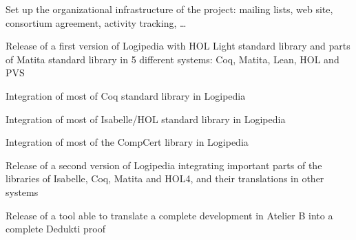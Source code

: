 

\begin{milestones}
    {Set up the organizational infrastructure of the project: mailing lists, web site, consortium agreement, activity tracking, \ldots}

     {Release of a first version of Logipedia with HOL Light standard library and parts of Matita standard library in 5 different systems: Coq, Matita, Lean, HOL and PVS}

     {Integration of most of Coq standard library in Logipedia}

     {Integration of most of Isabelle/HOL standard library in Logipedia}

     {Integration of most of the CompCert library in Logipedia}

     {Release of a second version of Logipedia integrating important parts of the libraries of Isabelle, Coq, Matita and HOL4, and their translations in other systems}

     {Release of a tool able to translate a complete development in Atelier B into a complete Dedukti proof}

\end{milestones}

